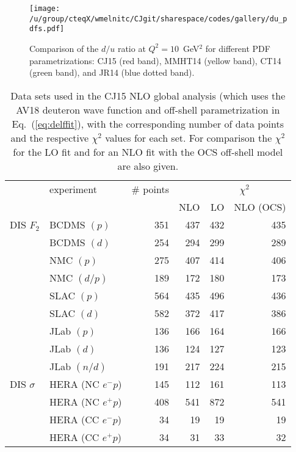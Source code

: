 \documentclass[aps,prd,amsmath,preprint]{revtex4}
\begin{document}
\begin{figure}[t]
\texttt{[image: /u/group/cteqX/wmelnitc/CJgit/sharespace/codes/gallery/du\_pdfs.pdf]}
\caption{Comparison of the $d/u$ ratio at $Q^2=10$~GeV$^2$ for different
	PDF parametrizations:
	CJ15 (red band),
	MMHT14 \cite{MMHT14} (yellow band),
	CT14 \cite{CT14} (green band), and
	JR14 \cite{JR14} (blue dotted band).}
\label{fig:du_pdfs}
\end{figure} 


\newpage
\begin{table}[t]
\caption{Data sets used in the CJ15 NLO global analysis (which uses
	the AV18 deuteron wave function and off-shell parametrization
	in Eq.~(\ref{eq:delffit}), with the corresponding number of
	data points and the respective $\chi^2$ values for each set.
	For comparison the $\chi^2$ for the LO fit and for an NLO
	fit with the OCS off-shell model are also given.\\}
\centering
{\scriptsize  
\begin{tabular}[c]{llrrrr}  \hline
  & experiment  & \# points\!\!\!\! & \multicolumn{3}{c}{\ \ \ \ \ $\chi^2$} \\
  & 		& 		    & NLO  & LO  & NLO (OCS) \\ \hline
DIS $F_2$
  & BCDMS $(p)$ 	\cite{BCDMS}    & 351 & 437 & 432 & 435 \\
  & BCDMS $(d)$ 	\cite{BCDMS}    & 254 & 294 & 299 & 289 \\
  & NMC   $(p)$   	\cite{NMCp}     & 275 & 407 & 414 & 406 \\
  & NMC   $(d/p)$ 	\cite{NMCdop}   & 189 & 172 & 180 & 173 \\
  & SLAC  $(p)$  	\cite{SLAC}     & 564 & 435 & 496 & 436 \\
  & SLAC  $(d)$  	\cite{SLAC}     & 582 & 372 & 417 & 386 \\
  & JLab  $(p)$  	\cite{Malace}   & 136 & 166 & 164 & 166 \\
  & JLab  $(d)$  	\cite{Malace}   & 136 & 124 & 127 & 123 \\
  & JLab  $(n/d)$	\cite{BONuS}  	& 191 & 217 & 224 & 215 \\
DIS $\sigma$
  & HERA (NC $e^-p$) 	\cite{HERA1}    & 145 & 112 & 161 & 113 \\
  & HERA (NC $e^+p$) 	\cite{HERA1}    & 408 & 541 & 872 & 541 \\
  & HERA (CC $e^-p$) 	\cite{HERA1}    &  34 &  19 &  19 &  19 \\
  & HERA (CC $e^+p$) 	\cite{HERA1}    &  34 &  31 &  33 &  32 \\

\end{tabular}}
\end{table}
\end{document}
